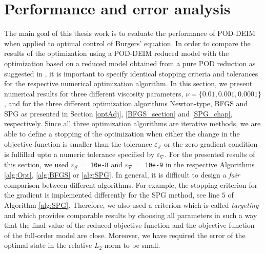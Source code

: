 \section{Performance and error analysis}
\label{numTests}
The main goal of this thesis work is to evaluate the performance of POD-DEIM when applied to optimal control of Burgers' equation. In order to compare the results of the optimization using a POD-DEIM reduced model with the optimization based on a reduced model obtained from a pure POD reduction as suggested in \cite{KV99}, it is important to specify identical stopping criteria and tolerances for the respective numerical optimization algorithm. In this section, we present numerical results for three different viscosity parameters, $\nu = \{0.01, 0.001, 0.0001\}$, and for the three different optimization algorithms Newton-type, BFGS and SPG as presented in Section \ref{optAdj}, \ref{BFGS_section} and \ref{SPG_chap}, respectively. Since all three optimization algorithms are iterative methods, we are able to define a stopping of the optimization when either the change in the objective function is smaller than the tolerance $\varepsilon_\mathcal{J}$ or the zero-gradient condition is fulfilled upto a numeric tolerance specified by $\varepsilon_\nabla$. For the presented results of this section, we used  $\varepsilon_\mathcal{J} =$ \texttt{10e-8} and $\varepsilon_\nabla =$ \texttt{10e-9} in the respective Algorithms \ref{alg:Opt}, \ref{alg:BFGS} or \ref{alg:SPG}. In general, it is difficult to design a \textit{fair} comparison between different algorithms. For example, the stopping criterion for the gradient is implemented differently for the SPG method, see line $5$ of Algorithm \ref{alg:SPG}. Therefore, we also used a criterion which is called \textit{targeting} and which provides comparable results by choosing all parameters in such a way that the final value of the reduced objective function and the objective function of the full-order model are close. Moreover, we have required the error of the optimal state in the relative $L_2$-norm to be small.

